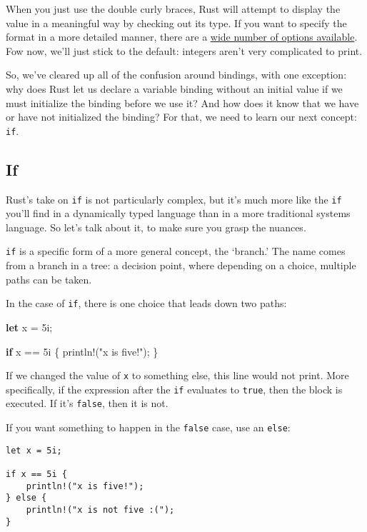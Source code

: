 \documentclass[]{article}
\newenvironment{Shaded}{}{}
\newcommand{\KeywordTok}[1]{\textcolor[rgb]{0.00,0.44,0.13}{\textbf{{#1}}}}
\newcommand{\DecValTok}[1]{\textcolor[rgb]{0.25,0.63,0.44}{{#1}}}
\newcommand{\StringTok}[1]{\textcolor[rgb]{0.25,0.44,0.63}{{#1}}}
\newcommand{\OtherTok}[1]{\textcolor[rgb]{0.00,0.44,0.13}{{#1}}}
\newcommand{\NormalTok}[1]{{#1}}
\begin{document}
When you just use the double curly braces, Rust will attempt to display
the value in a meaningful way by checking out its type. If you want to
specify the format in a more detailed manner, there are a
\href{/std/fmt/index.html}{wide number of options available}. Fow now,
we'll just stick to the default: integers aren't very complicated to
print.

So, we've cleared up all of the confusion around bindings, with one
exception: why does Rust let us declare a variable binding without an
initial value if we must initialize the binding before we use it? And
how does it know that we have or have not initialized the binding? For
that, we need to learn our next concept: \texttt{if}.

\subsection{If}\label{if}

Rust's take on \texttt{if} is not particularly complex, but it's much
more like the \texttt{if} you'll find in a dynamically typed language
than in a more traditional systems language. So let's talk about it, to
make sure you grasp the nuances.

\texttt{if} is a specific form of a more general concept, the `branch.'
The name comes from a branch in a tree: a decision point, where
depending on a choice, multiple paths can be taken.

In the case of \texttt{if}, there is one choice that leads down two
paths:

\begin{Shaded}
\begin{Highlighting}[]
\KeywordTok{let} \NormalTok{x = }\DecValTok{5i}\NormalTok{;}

\KeywordTok{if} \NormalTok{x == }\DecValTok{5i} \NormalTok{\{}
    \OtherTok{println!}\NormalTok{(}\StringTok{"x is five!"}\NormalTok{);}
\NormalTok{\}}
\end{Highlighting}
\end{Shaded}

If we changed the value of \texttt{x} to something else, this line would
not print. More specifically, if the expression after the \texttt{if}
evaluates to \texttt{true}, then the block is executed. If it's
\texttt{false}, then it is not.

If you want something to happen in the \texttt{false} case, use an
\texttt{else}:

\begin{verbatim}
let x = 5i;

if x == 5i {
    println!("x is five!");
} else {
    println!("x is not five :(");
}
\end{verbatim}
\end{document}
